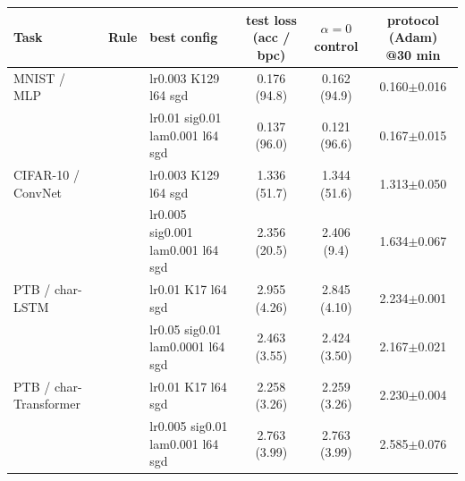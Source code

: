 \begin{tabular}{l l l c c c}
\toprule
Task & Rule & best config & test loss (acc / bpc) & $\alpha=0$ control & protocol (Adam) @30 min \\
\midrule
MNIST / MLP & \SPSAb{} & lr0.003 K129 l64 sgd & 0.176 (94.8) & 0.162 (94.9) & 0.160$\pm$0.016 \\
 & \ANPb{} & lr0.01 sig0.01 lam0.001 l64 sgd & 0.137 (96.0) & 0.121 (96.6) & 0.167$\pm$0.015 \\
\midrule
CIFAR-10 / ConvNet & \SPSAb{} & lr0.003 K129 l64 sgd & 1.336 (51.7) & 1.344 (51.6) & 1.313$\pm$0.050 \\
 & \ANPb{} & lr0.005 sig0.001 lam0.001 l64 sgd & 2.356 (20.5) & 2.406 (9.4) & 1.634$\pm$0.067 \\
\midrule
PTB / char-LSTM & \SPSAb{} & lr0.01 K17 l64 sgd & 2.955 (4.26) & 2.845 (4.10) & 2.234$\pm$0.001 \\
 & \ANPb{} & lr0.05 sig0.01 lam0.0001 l64 sgd & 2.463 (3.55) & 2.424 (3.50) & 2.167$\pm$0.021 \\
\midrule
PTB / char-Transformer & \SPSAb{} & lr0.01 K17 l64 sgd & 2.258 (3.26) & 2.259 (3.26) & 2.230$\pm$0.004 \\
 & \ANPb{} & lr0.005 sig0.01 lam0.001 l64 sgd & 2.763 (3.99) & 2.763 (3.99) & 2.585$\pm$0.076 \\
\bottomrule
\end{tabular}
